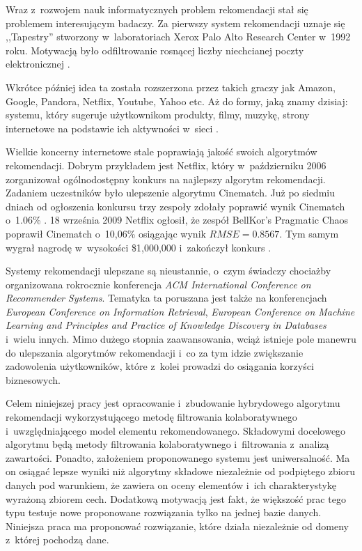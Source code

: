 \documentclass[twoside]{iisthesis}
\begin{document}
	 Wraz z~rozwojem nauk informatycznych problem rekomendacji stał się problemem interesującym badaczy. Za pierwszy system rekomendacji uznaje się ,,Tapestry'' stworzony w~laboratoriach Xerox Palo Alto Research Center w~1992 roku. Motywacją było odfiltrowanie rosnącej liczby niechcianej poczty elektronicznej \cite{id:FromTapestryToSVD}.
	 
	 Wkrótce później idea ta została rozszerzona przez takich graczy jak Amazon, Google, Pandora, Netflix, Youtube, Yahoo etc. Aż do formy, jaką znamy dzisiaj: systemu, który sugeruje użytkownikom produkty, filmy, muzykę, strony internetowe na podstawie ich aktywności w~sieci \cite{id:EvolutionOfRecommenderSystems}. 
	 
	 Wielkie koncerny internetowe stale poprawiają jakość swoich algorytmów rekomendacji. Dobrym przykładem jest Netflix, który w~październiku 2006 zorganizował ogólnodostępny konkurs na najlepszy algorytm rekomendacji. Zadaniem uczestników było ulepszenie algorytmu Cinematch. Już po siedmiu dniach od ogłoszenia konkursu trzy zespoły zdołały poprawić wynik Cinematch o~1.06\% \cite{id:NetflixPrize,id:NetflixPrizeRankings}. 18 września 2009 Netflix ogłosił, że zespół BellKor's Pragmatic Chaos poprawił Cinematch o~10,06\% osiągając wynik $RMSE = 0.8567$. Tym samym wygrał nagrodę w~wysokości \$1,000,000 i~zakończył konkurs \cite{id:NetflixPrize2,id:NetflixPrizeRules}.
	 
	 Systemy rekomendacji ulepszane są nieustannie, o~czym świadczy chociażby organizowana rokrocznie konferencja\textit{ ACM International Conference on Recommender Systems}. Tematyka ta poruszana jest także na konferencjach \textit{European Conference on Information Retrieval}, \textit{European Conference on Machine Learning and Principles and Practice of Knowledge Discovery in Databases} i~wielu innych. Mimo dużego stopnia zaawansowania, wciąż istnieje pole manewru do ulepszania algorytmów rekomendacji i~co za tym idzie zwiększanie zadowolenia użytkowników, które z~kolei prowadzi do osiągania korzyści biznesowych.
	 
	 Celem niniejszej pracy jest opracowanie i~zbudowanie hybrydowego algorytmu rekomendacji wykorzystującego metodę filtrowania kolaboratywnego i~uwzględniającego model elementu rekomendowanego. Składowymi docelowego algorytmu będą metody filtrowania kolaboratywnego i~filtrowania z~analizą zawartości. Ponadto, założeniem proponowanego systemu jest uniwersalność. Ma on osiągać lepsze wyniki niż algorytmy składowe niezależnie od podpiętego zbioru danych pod warunkiem, że zawiera on oceny elementów i~ich charakterystykę wyrażoną zbiorem cech. Dodatkową motywacją jest fakt, że większość prac tego typu testuje nowe proponowane rozwiązania tylko na jednej bazie danych. Niniejsza praca ma proponować rozwiązanie, które działa niezależnie od domeny z~której pochodzą dane.
	 
\end{document}
